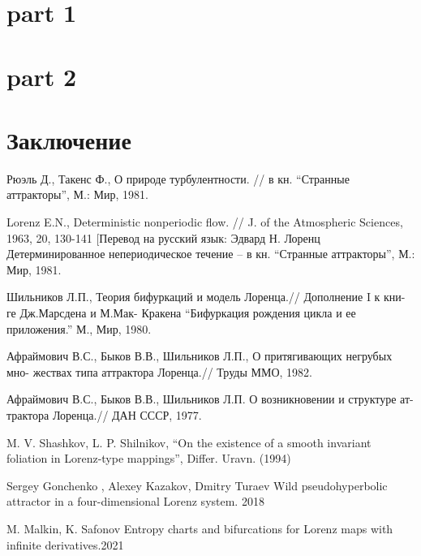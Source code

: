 \documentclass[14pt]{article}
\theoremstyle{definition}
\begin{document}
 
 
 \section{part 1}
 


\newpage
 \section{part 2}
 
 
 




\newpage
\section{Заключение}





\newpage
{}
\begin{thebibliography}{99}

Рюэль Д., Такенс Ф., О природе турбулентности. // в кн. “Странные аттракторы”, М.: Мир, 1981.

 Lorenz E.N., Deterministic nonperiodic flow. // J. of the Atmospheric Sciences, 1963, 20, 130-141 [Перевод на русский язык: Эдвард Н. Лоренц Детерминированное непериодическое течение – в кн. “Странные аттракторы”, М.: Мир, 1981.


 Шильников Л.П., Теория бифуркаций и модель Лоренца.// Дополнение I к кни- ге Дж.Марсдена и М.Мак- Кракена “Бифуркация рождения цикла и ее приложения.” М., Мир, 1980.

 Афраймович В.С., Быков В.В., Шильников Л.П., О притягивающих негрубых мно- жествах типа аттрактора Лоренца.// Труды ММО, 1982.

 Афраймович В.С., Быков В.В., Шильников Л.П. О возникновении и структуре ат- трактора Лоренца.// ДАН СССР, 1977.

 M. V. Shashkov, L. P. Shilnikov, “On the existence of a smooth invariant foliation in Lorenz-type mappings”, Differ. Uravn. (1994)

 Sergey Gonchenko , Alexey Kazakov,  Dmitry Turaev Wild pseudohyperbolic attractor in a four-dimensional Lorenz system. 2018

 M. Malkin, K. Safonov Entropy charts and bifurcations for Lorenz maps with infinite derivatives.2021


\end{thebibliography}
\end{document}
